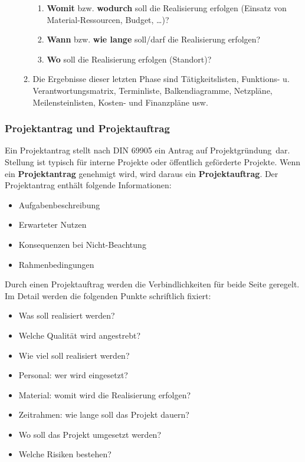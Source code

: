 \begin{enumerate}
\begin{enumerate}
\begin{enumerate}
				\item {\bf Womit} bzw. {\bf wodurch} soll die Realisierung erfolgen (Einsatz von Material-Ressourcen, Budget, \dots)?
				\item {\bf Wann} bzw. {\bf wie lange} soll/darf die Realisierung erfolgen?
				\item {\bf Wo} soll die Realisierung erfolgen (Standort)?
			\end{enumerate}				 
		\item Die Ergebnisse dieser letzten Phase sind Tätigkeitslisten, Funktions- u. Verantwortungsmatrix, Terminliste, Balkendiagramme, Netzpläne, Meilensteinlisten, Kosten- und Finanzpläne usw.
	\end{enumerate}	
\end{enumerate}

\subsubsection{Projektantrag und Projektauftrag}

Ein Projektantrag stellt nach DIN 69905 ein \ql Antrag auf Projektgründung\qr\ dar. Stellung ist typisch für interne Projekte oder öffentlich geförderte Projekte. Wenn ein \textbf{Projektantrag} genehmigt wird, wird daraus ein \textbf{Projektauftrag}. Der Projektantrag enthält folgende Informationen:
\begin{itemize}
	\item Aufgabenbeschreibung
	\item Erwarteter Nutzen
	\item Konsequenzen bei Nicht-Beachtung
	\item Rahmenbedingungen
\end{itemize}
\noindent Durch einen Projektauftrag werden die Verbindlichkeiten für beide Seite geregelt. Im Detail werden die folgenden Punkte schriftlich fixiert:
\begin{itemize}
	\item Was soll realisiert werden?
	\item Welche Qualität wird angestrebt?
	\item Wie viel soll realisiert werden?
	\item Personal: wer wird eingesetzt?
	\item Material: womit wird die Realisierung erfolgen?
	\item Zeitrahmen: wie lange soll das Projekt dauern?
	\item Wo soll das Projekt umgesetzt werden?
	\item Welche Risiken bestehen?
\end{itemize}

